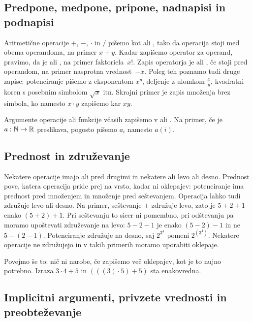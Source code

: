 \subsection{Predpone, medpone, pripone, nadnapisi in podnapisi}

Aritmetične operacije $+$, $-$, $\cdot$ in $/$ pišemo kot  ali , tako da operacija
stoji med obema operandoma, na primer $x + y$. Kadar zapišemo operator za operand,
pravimo, da je  ali , na primer faktoriela~$x!$. Zapis operatorja je
 ali , če stoji pred operandom, na primer nasprotna vrednost~$-x$. Poleg teh
poznamo tudi druge zapise: potenciranje pišemo z eksponentom $x^y$, deljenje z ulomkom
$\frac{x}{y}$, kvadratni koren s posebnim simbolom $\sqrt{x}$ itn. Skrajni primer je zapis
množenja brez simbola, ko namesto $x \cdot y$ zapišemo kar $x y$.

Argumente operacije ali funkcije včasih zapišemo v  ali . Na primer, če je $a : \mathbb{N} \to \mathbb{R}$ preslikava, pogosto pišemo $a_i$ namesto $a(i)$.

\subsection{Prednost in združevanje}

Nekatere operacije imajo  ali  pred drugimi in nekatere  ali  levo ali desno. Prednost pove, katera operacija pride prej na vrsto, kadar ni oklepajev:
potenciranje ima prednost pred množenjem in množenje pred seštevanjem. Operacija lahko
tudi združuje levo ali desno. Na primer, seštevanje $+$ združuje levo, zato je $5 + 2 + 1$
enako $(5 + 2) + 1$. Pri seštevanju to sicer ni pomembno, pri odštevanju pa moramo
upoštevati združevanje na levo: $5 - 2 - 1$ je enako $(5 - 2) - 1$ in ne $5 - (2 - 1)$.
Potenciranje združuje na desno, saj $2^{3^4}$ pomeni $2^{(3^4)}$. Nekatere operacije ne
združujejo in v takih primerih moramo uporabiti oklepaje.

Povejmo še to: nič ni narobe, če zapišemo več oklepajev, kot je to nujno potrebno. Izraza $3 \cdot 4 + 5$ in $(((3) \cdot 5) + 5)$ sta enakovredna.

\subsection{Implicitni argumenti, privzete vrednosti in preobteževanje}
\label{sec:implicitni-argumenti}


